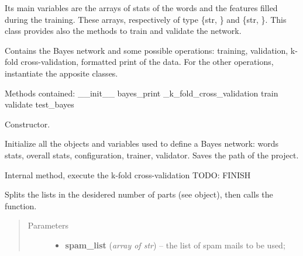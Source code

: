 \documentclass[letterpaper,10pt,english]{sphinxmanual}
\begin{document}
Its main variables are the arrays of stats of the words and the features filled during the training. These arrays, respectively of type \{str, {\hyperref[index:gen_stat.Word]{}}\} and \{str, {\hyperref[index:gen_stat.Stat]{}}\}. This class provides also the methods to train and validate the network.
\label{index:module-naive_bayes}

\begin{fulllineitems}
\label{index:naive_bayes.Bayes}
Contains the Bayes network and some possible operations: training,
validation, k-fold cross-validation, formatted print of the data.
For the other operations, instantiate the apposite classes.

Methods contained:
\_\_init\_\_
bayes\_print
\_k\_fold\_cross\_validation
train
validate
test\_bayes

\begin{fulllineitems}
\label{index:naive_bayes.Bayes.__init__}
Constructor.

Initialize all the objects and variables used to define a Bayes network:
words stats, overall stats, configuration, trainer, validator.
Saves the path of the project.

\end{fulllineitems}


\begin{fulllineitems}
\label{index:naive_bayes.Bayes._k_fold_cross_validation}
Internal method, execute the k-fold cross-validation TODO: FINISH

Splits the lists in the desidered number of parts
(see {\hyperref[index:config.Config]{}} object),
then calls the {\hyperref[index:trainer.Trainer.train]{}} function.
\begin{quote}\begin{description}
\item[{Parameters}] \leavevmode\begin{itemize}
\item {} 
\textbf{spam\_list} (\emph{array of str}) -- the list of spam mails to be used;


\end{itemize}
\end{description}
\end{quote}
\end{fulllineitems}
\end{fulllineitems}
\end{document}
